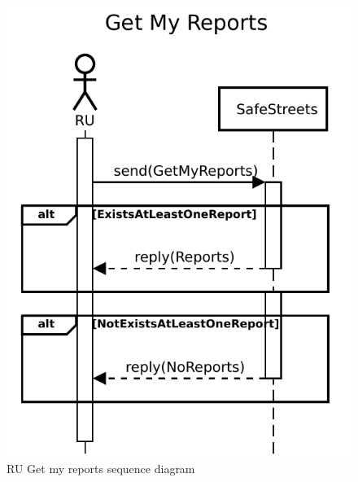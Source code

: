					\begin{figure}[ht]
								\centering
						\includegraphics[height=0.4\textheight] {images/SequenceDiagram/User/GetMyReports.pdf}
								\caption{RU Get my reports sequence diagram}
						\end{figure}
